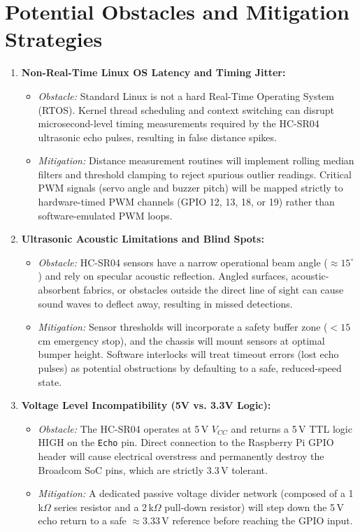 \documentclass[12pt]{article}
\begin{document}
\clearpage
\section{Potential Obstacles and Mitigation Strategies}

\begin{enumerate}
    \item \textbf{Non-Real-Time Linux OS Latency and Timing Jitter:}
    \begin{itemize}
        \item \textit{Obstacle:} Standard Linux is not a hard Real-Time Operating System (RTOS). Kernel thread scheduling and context switching can disrupt microsecond-level timing measurements required by the HC-SR04 ultrasonic echo pulses, resulting in false distance spikes.
        \item \textit{Mitigation:} Distance measurement routines will implement rolling median filters and threshold clamping to reject spurious outlier readings. Critical PWM signals (servo angle and buzzer pitch) will be mapped strictly to hardware-timed PWM channels (GPIO 12, 13, 18, or 19) rather than software-emulated PWM loops.
    \end{itemize}

    \item \textbf{Ultrasonic Acoustic Limitations and Blind Spots:}
    \begin{itemize}
        \item \textit{Obstacle:} HC-SR04 sensors have a narrow operational beam angle ($\approx 15^\circ$) and rely on specular acoustic reflection. Angled surfaces, acoustic-absorbent fabrics, or obstacles outside the direct line of sight can cause sound waves to deflect away, resulting in missed detections.
        \item \textit{Mitigation:} Sensor thresholds will incorporate a safety buffer zone ($<15$\,cm emergency stop), and the chassis will mount sensors at optimal bumper height. Software interlocks will treat timeout errors (lost echo pulses) as potential obstructions by defaulting to a safe, reduced-speed state.
    \end{itemize}

    \item \textbf{Voltage Level Incompatibility (5V vs. 3.3V Logic):}
    \begin{itemize}
        \item \textit{Obstacle:} The HC-SR04 operates at 5\,V $V_{CC}$ and returns a 5\,V TTL logic HIGH on the \texttt{Echo} pin. Direct connection to the Raspberry Pi GPIO header will cause electrical overstress and permanently destroy the Broadcom SoC pins, which are strictly 3.3\,V tolerant.
        \item \textit{Mitigation:} A dedicated passive voltage divider network (composed of a 1\,k$\Omega$ series resistor and a 2\,k$\Omega$ pull-down resistor) will step down the 5\,V echo return to a safe $\approx 3.33$\,V reference before reaching the GPIO input.
    \end{itemize}

\end{enumerate}
\end{document}
